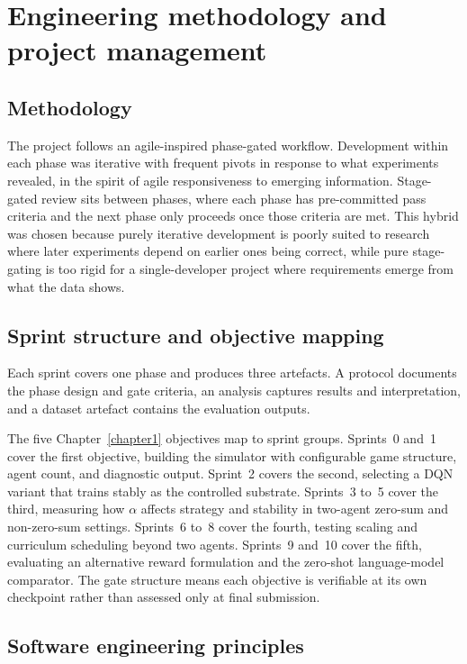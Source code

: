 \section{Engineering methodology and project management}
\label{sec:engineering}

\subsection{Methodology}

The project follows an agile-inspired phase-gated workflow. Development within each phase was iterative with frequent pivots in response to what experiments revealed, in the spirit of agile responsiveness to emerging information. Stage-gated review sits between phases, where each phase has pre-committed pass criteria and the next phase only proceeds once those criteria are met. This hybrid was chosen because purely iterative development is poorly suited to research where later experiments depend on earlier ones being correct, while pure stage-gating is too rigid for a single-developer project where requirements emerge from what the data shows.

\subsection{Sprint structure and objective mapping}

Each sprint covers one phase and produces three artefacts. A protocol documents the phase design and gate criteria, an analysis captures results and interpretation, and a dataset artefact contains the evaluation outputs.

The five Chapter~\ref{chapter1} objectives map to sprint groups. Sprints~0 and~1 cover the first objective, building the simulator with configurable game structure, agent count, and diagnostic output. Sprint~2 covers the second, selecting a DQN variant that trains stably as the controlled substrate. Sprints~3 to~5 cover the third, measuring how $\alpha$ affects strategy and stability in two-agent zero-sum and non-zero-sum settings. Sprints~6 to~8 cover the fourth, testing scaling and curriculum scheduling beyond two agents. Sprints~9 and~10 cover the fifth, evaluating an alternative reward formulation and the zero-shot language-model comparator. The gate structure means each objective is verifiable at its own checkpoint rather than assessed only at final submission.

\subsection{Software engineering principles}

